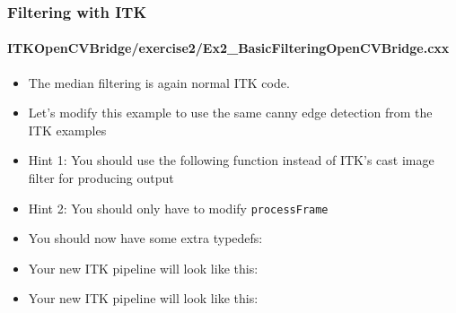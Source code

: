 \begin{frame}
\frametitle{Filtering with ITK}
\framesubtitle{ITKOpenCVBridge/exercise2/Ex2\_BasicFilteringOpenCVBridge.cxx}
\begin{itemize}
\item The median filtering is again normal ITK code.
\end{itemize}
\end{frame}

\begin{frame}
\begin{itemize}
\frametitle{Exercise 2}
\framesubtitle{ITKOpenCVBridge/exercise2/Ex2\_BasicFilteringOpenCVBridge.cxx}
\item Let's modify this example to use the same canny edge detection
  from the ITK examples
\pause 
\item Hint 1: You should use the following function instead of ITK's
cast image filter for producing output
\pause
\item Hint 2: You should only have to modify {\tt processFrame}
\end{itemize}
\end{frame}

\begin{frame}
\begin{itemize}
\frametitle{Exercise 2: Answer}
\framesubtitle{ITKOpenCVBridge/exercise2/Ex2\_BasicFilteringOpenCVBridgeAnswer.cxx}
\item You should now have some extra typedefs:
\end{itemize}
\end{frame}

\begin{frame}
\begin{itemize}
\frametitle{Exercise 2: Answer}
\framesubtitle{ITKOpenCVBridge/exercise2/Ex2\_BasicFilteringOpenCVBridgeAnswer.cxx}
\item Your new ITK pipeline will look like this:
\end{itemize}
\end{frame}

\begin{frame}
\begin{itemize}
\frametitle{Exercise 2: Answer}
\framesubtitle{ITKOpenCVBridge/exercise2/Ex2\_BasicFilteringOpenCVBridgeAnswer.cxx}
\item Your new ITK pipeline will look like this:
\end{itemize}
\end{frame}